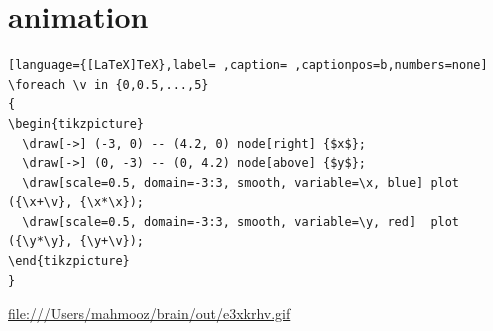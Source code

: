 \documentclass[a4paper,12pt]{article}
\begin{document}
\section{animation}
\label{sec:org8cffcda}
\begin{lstlisting}[language={[LaTeX]TeX},label= ,caption= ,captionpos=b,numbers=none]
\foreach \v in {0,0.5,...,5}
{
\begin{tikzpicture}
  \draw[->] (-3, 0) -- (4.2, 0) node[right] {$x$};
  \draw[->] (0, -3) -- (0, 4.2) node[above] {$y$};
  \draw[scale=0.5, domain=-3:3, smooth, variable=\x, blue] plot ({\x+\v}, {\x*\x});
  \draw[scale=0.5, domain=-3:3, smooth, variable=\y, red]  plot ({\y*\y}, {\y+\v});
\end{tikzpicture}
}
\end{lstlisting}

\url{file:///Users/mahmooz/brain/out/e3xkrhv.gif}\\[0pt]
\end{document}
